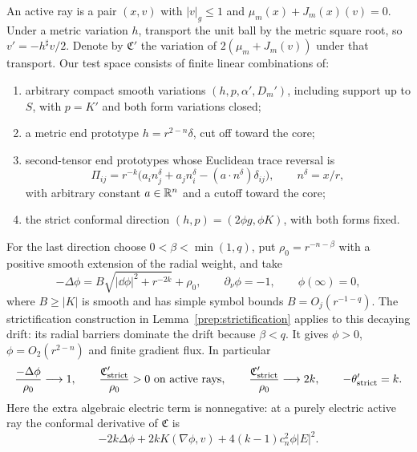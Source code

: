 An active ray is a pair $(x,v)$ with $|v|_g\le1$ and
$\mu_m(x)+J_m(x)(v)=0$.  Under a metric variation $h$, transport the
unit ball by the metric square root, so $v'=-h^\sharp v/2$.  Denote by
$\mathfrak C'$ the variation of $2(\mu_m+J_m(v))$ under that
transport.  Our test space consists of finite linear combinations of:
\begin{enumerate}[label=(\roman*)]
 \item arbitrary compact smooth variations $(h,p,\alpha',D_m')$,
 including support up to $S$, with $p=K'$ and both form variations
 closed;
 \item a metric end prototype $h=r^{2-n}\delta$, cut off toward the
 core;
 \item second-tensor end prototypes whose Euclidean trace reversal is
 \begin{equation}
  \Pi_{ij}=r^{-k}
   \bigl(a_i n_j^\delta+a_j n_i^\delta
                     -(a\cdot n^\delta)\delta_{ij}\bigr),
  \qquad n^\delta=x/r,
  \label{var:momentum-prototype}
 \end{equation}
 with arbitrary constant $a\in\mathbb R^n$ and a cutoff toward the core;
 \item the strict conformal direction $(h,p)=(2\phi g,\phi K)$,
 with both forms fixed.
\end{enumerate}
For the last direction choose $0<\beta<\min(1,q)$, put
$\rho_0=r^{-n-\beta}$ with a positive smooth extension of the radial
weight, and take
\begin{equation}
 -\Delta\phi=B\sqrt{|\dd\phi|^2+r^{-2k}}+\rho_0,
 \qquad \partial_\nu\phi=-1,
 \qquad \phi(\infty)=0,
 \label{var:strict-direction}
\end{equation}
where $B\ge |K|$ is smooth and has simple symbol bounds
$B=O_j(r^{-1-q})$.  The strictification construction in
Lemma~\ref{prep:strictification} applies to this decaying drift:
its radial barriers dominate the drift because $\beta<q$.  It gives
$\phi>0$, $\phi=O_2(r^{2-n})$ and finite gradient flux.  In
particular
\begin{equation}
 \frac{-\Delta\phi}{\rho_0}\longrightarrow1,
 \qquad
 \frac{\mathfrak C'_{\rm strict}}{\rho_0}>0
 \text{ on active rays},\qquad
 \frac{\mathfrak C'_{\rm strict}}{\rho_0}\longrightarrow2k,
 \qquad -\theta'_{\rm strict}=k.
 \label{var:strict-tail}
\end{equation}
Here the extra algebraic electric term is nonnegative: at a purely
electric active ray the conformal derivative of $\mathfrak C$ is
\begin{equation}
 -2k\Delta\phi+2kK(\nabla\phi,v)
                  +4(k-1)c_n^2\phi|E|^2.
 \label{var:conformal-active-derivative}
\end{equation}


